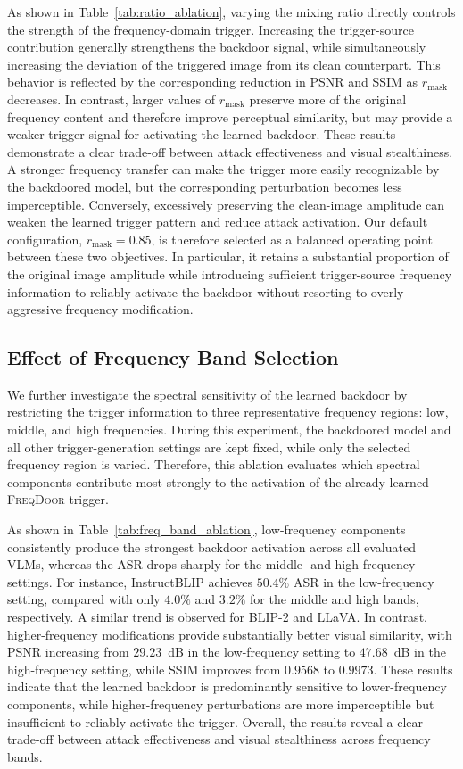 \documentclass[lettersize,journal]{IEEEtran}
\begin{document}
As shown in Table~\ref{tab:ratio_ablation}, varying the mixing ratio directly controls the strength of the frequency-domain trigger. Increasing the trigger-source contribution generally strengthens the backdoor signal, while simultaneously increasing the deviation of the triggered image from its clean counterpart. This behavior is reflected by the corresponding reduction in PSNR and SSIM as $r_{\mathrm{mask}}$ decreases. In contrast, larger values of $r_{\mathrm{mask}}$ preserve more of the original frequency content and therefore improve perceptual similarity, but may provide a weaker trigger signal for activating the learned backdoor. These results demonstrate a clear trade-off between attack effectiveness and visual stealthiness. A stronger frequency transfer can make the trigger more easily recognizable by the backdoored model, but the corresponding perturbation becomes less imperceptible. Conversely, excessively preserving the clean-image amplitude can weaken the learned trigger pattern and reduce attack activation. Our default configuration, $r_{\mathrm{mask}}=0.85$, is therefore selected as a balanced operating point between these two objectives. In particular, it retains a substantial proportion of the original image amplitude while introducing sufficient trigger-source frequency information to reliably activate the backdoor without resorting to overly aggressive frequency modification.

\subsection{Effect of Frequency Band Selection}
\label{subsec:ablation_band}

We further investigate the spectral sensitivity of the learned backdoor by restricting the trigger information to three representative frequency regions: low, middle, and high frequencies. During this experiment, the backdoored model and all other trigger-generation settings are kept fixed, while only the selected frequency region is varied. Therefore, this ablation evaluates which spectral components contribute most strongly to the activation of the already learned \textsc{FreqDoor} trigger.

As shown in Table~\ref{tab:freq_band_ablation}, low-frequency components consistently produce the strongest backdoor activation across all evaluated VLMs, whereas the ASR drops sharply for the middle- and high-frequency settings. For instance, InstructBLIP achieves $50.4\%$ ASR in the low-frequency setting, compared with only $4.0\%$ and $3.2\%$ for the middle and high bands, respectively. A similar trend is observed for BLIP-2 and LLaVA. In contrast, higher-frequency modifications provide substantially better visual similarity, with PSNR increasing from $29.23$~dB in the low-frequency setting to $47.68$~dB in the high-frequency setting, while SSIM improves from $0.9568$ to $0.9973$. These results indicate that the learned backdoor is predominantly sensitive to lower-frequency components, while higher-frequency perturbations are more imperceptible but insufficient to reliably activate the trigger. Overall, the results reveal a clear trade-off between attack effectiveness and visual stealthiness across frequency bands.
\end{document}
